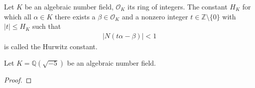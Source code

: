 \begin{defbox}
    \begin{definition}
        Let \(K\) be an algebraic number field, \(\mathcal{O}_K\) its ring of integers. The constant \(H_K\) for which all \(\alpha \in K\) there exists a \(\beta \in \mathcal{O}_K\) and a nonzero integer \(t \in \mathbb{Z} \setminus \{0\}\) with \(|t| \leq H_K\) such that
        \begin{align*}
            |N(t \alpha - \beta)| < 1
        \end{align*}
        is called the Hurwitz constant.
    \end{definition}
\end{defbox}

\begin{example}
    Let \(K = \mathbb{Q}(\sqrt{-5})\) be an algebraic number field.
\end{example}
\begin{proof}
    
\end{proof}

